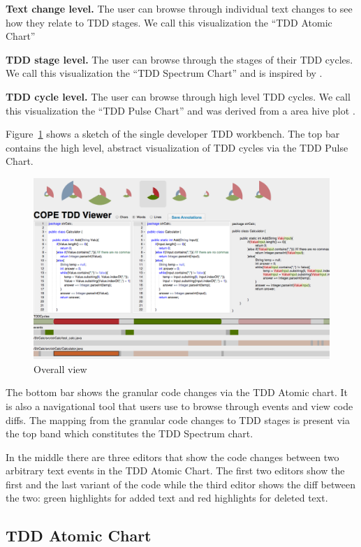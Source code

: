 \documentclass[journal]{vgtc}                %
\begin{document}
\textbf{Text change level.} The user can browse through individual text changes to see how they relate to TDD stages. We call this visualization the ``TDD Atomic Chart''

\textbf{TDD stage level.} The user can browse through the stages of their TDD cycles. We call this visualization the ``TDD Spectrum Chart'' and is inspired by \cite{one}.

\textbf{TDD cycle level.} The user can browse through high level TDD cycles. We call this visualization the ``TDD Pulse Chart'' and was derived from a area hive plot \cite{four}. 

Figure~\ref{fig:one} shows a sketch of the single developer TDD workbench.
The top bar contains the high level, abstract visualization of TDD cycles via the TDD Pulse Chart. 

\begin{figure}[hbt]
	\includegraphics[width=\textwidth]{fig1}
	\caption{Overall view}
\label{fig:one}
\end{figure}

The bottom bar shows the granular code changes via the TDD Atomic chart. It is also a navigational tool that users use to browse through events and view code diffs.
The mapping from the granular code changes to TDD stages is present via the top band which constitutes the TDD Spectrum chart.

In the middle there are three editors that show the code changes between two arbitrary text events in the TDD Atomic Chart. The first two editors show the first and the last variant of the code while the third editor shows the diff between the two: green highlights for added text and red highlights for deleted text.

\subsection{TDD Atomic Chart}
\label{sec:atomic}
\end{document}
